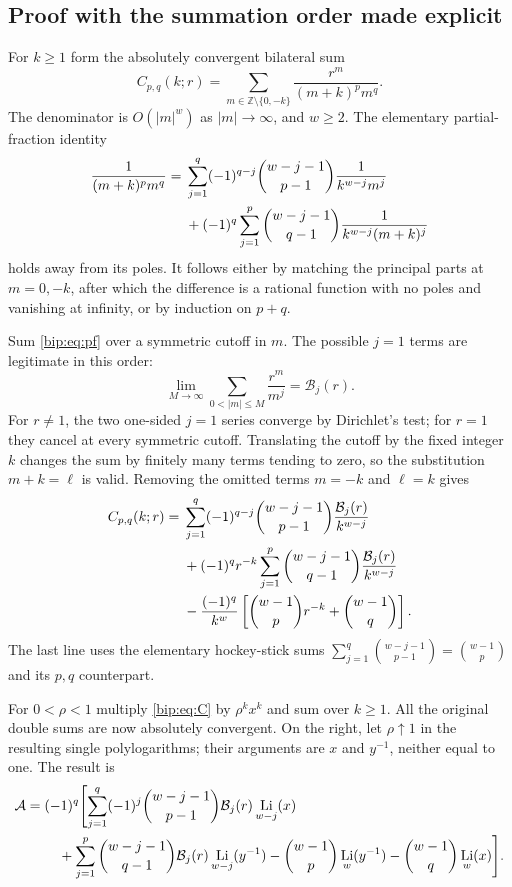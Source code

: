 \documentclass[11pt,a4paper]{article}
\numberwithin{equation}{section}
\theoremstyle{definition}
\theoremstyle{remark}
\DeclareMathOperator{\Li}{Li}
\begin{document}
\subsection{Proof with the summation order made explicit}
For $k\ge1$ form the absolutely convergent bilateral sum
\[
 C_{p,q}(k;r)=\sum_{m\in\mathbb Z\setminus\{0,-k\}}
       \frac{r^m}{(m+k)^pm^q}.
\]
The denominator is $O(|m|^w)$ as $|m|\to\infty$, and $w\ge2$.
The elementary partial-fraction identity
\begin{align}
 \frac1{(m+k)^pm^q}
 ={}&\sum_{j=1}^q(-1)^{q-j}\binom{w-j-1}{p-1}
       \frac1{k^{w-j}m^j}\notag\\
 &+(-1)^q\sum_{j=1}^p\binom{w-j-1}{q-1}
       \frac1{k^{w-j}(m+k)^j}
 \label{bip:eq:pf}
\end{align}
holds away from its poles.  It follows either by matching the principal
parts at $m=0,-k$, after which the difference is a rational function
with no poles and vanishing at infinity, or by induction on $p+q$.

Sum \eqref{bip:eq:pf} over a symmetric cutoff in $m$.  The possible
$j=1$ terms are legitimate in this order:
\[
 \underset{M\to\infty}{\lim}\sum_{0<|m|\le M}\frac{r^m}{m^j}
      =\mathcal B_j(r).
\]
For $r\ne1$, the two one-sided $j=1$ series converge by Dirichlet's
test; for $r=1$ they cancel at every symmetric cutoff.  Translating
the cutoff by the fixed integer $k$ changes the sum by finitely many
terms tending to zero, so the substitution $m+k=\ell$ is valid.
Removing the omitted terms $m=-k$ and $\ell=k$ gives
\begin{align}
 C_{p,q}(k;r)={}&
 \sum_{j=1}^q(-1)^{q-j}\binom{w-j-1}{p-1}
   \frac{\mathcal B_j(r)}{k^{w-j}}\notag\\
 &+(-1)^qr^{-k}\sum_{j=1}^p\binom{w-j-1}{q-1}
   \frac{\mathcal B_j(r)}{k^{w-j}}\notag\\
 &-\frac{(-1)^q}{k^w}
       \left[\binom{w-1}{p}r^{-k}+\binom{w-1}{q}\right].
 \label{bip:eq:C}
\end{align}
The last line uses the elementary hockey-stick sums
$\sum_{j=1}^q\binom{w-j-1}{p-1}=\binom{w-1}{p}$ and its
$p,q$ counterpart.

For $0<\rho<1$ multiply \eqref{bip:eq:C} by $\rho^kx^k$ and sum over
$k\ge1$. All the original double sums are now absolutely convergent.
On the right, let $\rho\uparrow1$ in the resulting single
polylogarithms; their arguments are $x$ and $y^{-1}$, neither equal
to one.  The result is
\begin{align}
 \mathcal A={}&(-1)^q\Biggl[
 \sum_{j=1}^q(-1)^j\binom{w-j-1}{p-1}
       \mathcal B_j(r)\Li_{w-j}(x)\notag\\
 &\quad+\sum_{j=1}^p\binom{w-j-1}{q-1}
       \mathcal B_j(r)\Li_{w-j}(y^{-1})
       -\binom{w-1}{p}\Li_w(y^{-1})
       -\binom{w-1}{q}\Li_w(x)\Biggr].
 \label{bip:eq:A}
\end{align}
\end{document}
